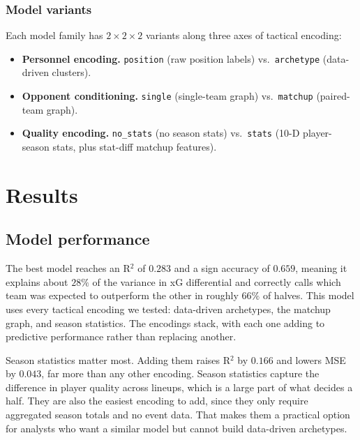 \documentclass[11pt,twocolumn]{article}
\begin{document}
\subsubsection{Model variants}
Each model family has $2{\times}2{\times}2$ variants along three axes of
tactical encoding:
\begin{itemize}
  \item \textbf{Personnel encoding.} \texttt{position} (raw position
        labels) vs.\ \texttt{archetype} (data-driven clusters).
  \item \textbf{Opponent conditioning.} \texttt{single} (single-team graph)
        vs.\ \texttt{matchup} (paired-team graph).
  \item \textbf{Quality encoding.} \texttt{no\_stats} (no season stats)
        vs.\ \texttt{stats} (10-D player-season stats, plus stat-diff
        matchup features).
\end{itemize}




\section{Results}
\subsection{Model performance}

The best model reaches an R$^2$ of $0.283$ and a sign accuracy of
$0.659$, meaning it explains about $28\%$ of the variance in xG
differential and correctly calls which team was expected to outperform
the other in roughly $66\%$ of halves. This model uses every tactical
encoding we tested: data-driven archetypes, the matchup graph, and season
statistics. The encodings stack, with each one adding to predictive
performance rather than replacing another.

Season statistics matter most. Adding them raises R$^2$ by $0.166$ and
lowers MSE by $0.043$, far more than any other encoding. Season
statistics capture the difference in player quality across lineups, which
is a large part of what decides a half. They are also the easiest
encoding to add, since they only require aggregated season totals and no
event data. That makes them a practical option for analysts who want a
similar model but cannot build data-driven archetypes.
\end{document}
